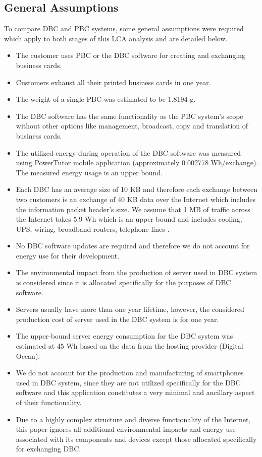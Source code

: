 \documentclass[3p,times,procedia]{elsarticle}
\begin{document}
\subsection{General Assumptions}\label{Generalassume}
To compare DBC and PBC systems, some general assumptions were required which apply to both stages of this LCA analysis and are detailed below.

\begin{itemize}[]
\item The customer uses PBC or the DBC software for creating and exchanging business cards.
\item Customers exhaust all their printed business cards in one year.
\item The weight of a single PBC was estimated to be 1.8194 g.
\item The DBC software has the same functionality as the PBC system's scope without other options like management, broadcast, copy and translation of business cards.
\item The utilized energy during operation of the DBC software was measured using PowerTutor mobile application\cite{zhang2010accurate} (approximately 0.002778 Wh/exchange). The measured energy usage is an upper bound.
 \item Each DBC has an average size of 10 KB and therefore each exchange between two customers is an exchange of 40 KB data over the Internet which includes the information packet header's size. We assume that 1 MB of traffic across the Internet takes 5.9 Wh which is an upper bound and includes cooling, UPS, wiring, broadband routers, telephone lines \cite{Moshnyaga:2013}. 
\item No DBC software updates are required and therefore we do not account for energy use for their development.
\item The environmental impact from the production of server used in DBC system is considered since it is allocated specifically for the purposes of DBC software.
\item Servers usually have more than one year lifetime, however, the considered production cost of server used in the DBC system is for one year.
 \item The upper-bound server energy consumption for the DBC system was estimated at 45 Wh based on the data from the hosting provider (Digital Ocean).
\item We do not account for the production and manufacturing of smartphones used in DBC system, since they are not utilized specifically for the DBC software and this application constitutes a very minimal and ancillary aspect of their functionality.
\item Due to a highly complex structure and diverse functionality of the Internet, this paper ignores all additional environmental impacts and energy use associated with its components and devices except those allocated specifically for exchanging DBC.
\end{itemize}
\end{document}
